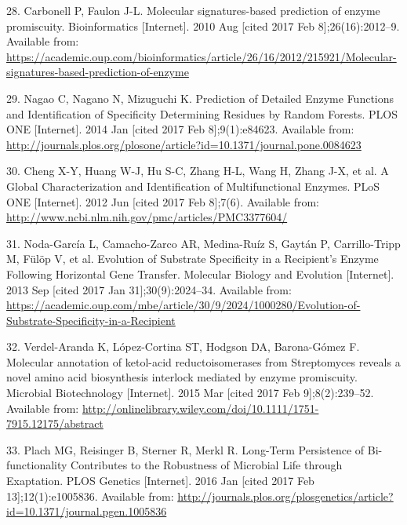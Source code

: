 \documentclass[12pt,twoside]{reedthesis}
\begin{document}
  \hypertarget{ref-carbonell_molecular_2010}{}
  28. Carbonell P, Faulon J-L. Molecular signatures-based prediction of
  enzyme promiscuity. Bioinformatics {[}Internet{]}. 2010 Aug {[}cited
  2017 Feb 8{]};26(16):2012--9. Available from:
  \url{https://academic.oup.com/bioinformatics/article/26/16/2012/215921/Molecular-signatures-based-prediction-of-enzyme}
  
  \hypertarget{ref-nagao_prediction_2014}{}
  29. Nagao C, Nagano N, Mizuguchi K. Prediction of Detailed Enzyme
  Functions and Identification of Specificity Determining Residues by
  Random Forests. PLOS ONE {[}Internet{]}. 2014 Jan {[}cited 2017 Feb
  8{]};9(1):e84623. Available from:
  \url{http://journals.plos.org/plosone/article?id=10.1371/journal.pone.0084623}
  
  \hypertarget{ref-cheng_global_2012}{}
  30. Cheng X-Y, Huang W-J, Hu S-C, Zhang H-L, Wang H, Zhang J-X, et al. A
  Global Characterization and Identification of Multifunctional Enzymes.
  PLoS ONE {[}Internet{]}. 2012 Jun {[}cited 2017 Feb 8{]};7(6). Available
  from: \url{http://www.ncbi.nlm.nih.gov/pmc/articles/PMC3377604/}
  
  \hypertarget{ref-noda-garcia_evolution_2013}{}
  31. Noda-García L, Camacho-Zarco AR, Medina-Ruíz S, Gaytán P,
  Carrillo-Tripp M, Fülöp V, et al. Evolution of Substrate Specificity in
  a Recipient's Enzyme Following Horizontal Gene Transfer. Molecular
  Biology and Evolution {[}Internet{]}. 2013 Sep {[}cited 2017 Jan
  31{]};30(9):2024--34. Available from:
  \url{https://academic.oup.com/mbe/article/30/9/2024/1000280/Evolution-of-Substrate-Specificity-in-a-Recipient}
  
  \hypertarget{ref-verdel-aranda_molecular_2015}{}
  32. Verdel-Aranda K, López-Cortina ST, Hodgson DA, Barona-Gómez F.
  Molecular annotation of ketol-acid reductoisomerases from Streptomyces
  reveals a novel amino acid biosynthesis interlock mediated by enzyme
  promiscuity. Microbial Biotechnology {[}Internet{]}. 2015 Mar {[}cited
  2017 Feb 9{]};8(2):239--52. Available from:
  \url{http://onlinelibrary.wiley.com/doi/10.1111/1751-7915.12175/abstract}
  
  \hypertarget{ref-plach_long-term_2016}{}
  33. Plach MG, Reisinger B, Sterner R, Merkl R. Long-Term Persistence of
  Bi-functionality Contributes to the Robustness of Microbial Life through
  Exaptation. PLOS Genetics {[}Internet{]}. 2016 Jan {[}cited 2017 Feb
  13{]};12(1):e1005836. Available from:
  \url{http://journals.plos.org/plosgenetics/article?id=10.1371/journal.pgen.1005836}
  
\end{document}
